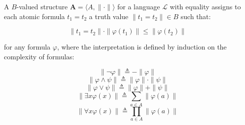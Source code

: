 A $B$-valued structure $\mathbf{A} = \langle A, \|{\cdot}\| \rangle$ for a language $\mathcal{L}$ with equality assigns to each atomic formula $t_1 = t_2$ a truth value $\|t_1 = t_2\| \in B$ such that:

$$\|t_1 = t_2\| \cdot \|\varphi(t_1)\| \leq \|\varphi(t_2)\|$$

for any formula $\varphi$, where the interpretation is defined by induction on the complexity of formulas:

$$\|\neg \varphi\| \triangleq - \|\varphi\|$$
$$\|\varphi \land \psi\| \triangleq \|\varphi\| \cdot \|\psi\|$$
$$\|\varphi \lor \psi\| \triangleq \|\varphi\| + \|\psi\|$$
$$\|\exists x \varphi(x)\| \triangleq \sum_{a \in A} \|\varphi(a)\|$$
$$\|\forall x \varphi(x)\| \triangleq \prod_{a \in A} \|\varphi(a)\|$$

